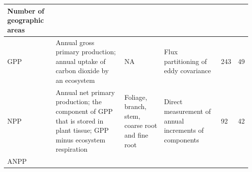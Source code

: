 \documentclass[]{article}
\begin{document}
\begin{longtable}[]{@{}llllll@{}}
\begin{minipage}[b]{0.07\columnwidth}
Number of geographic areas\strut
\end{minipage}\tabularnewline
\midrule
\endhead
\begin{minipage}[t]{0.14\columnwidth}\raggedright\strut
GPP\strut
\end{minipage} & \begin{minipage}[t]{0.19\columnwidth}\raggedright\strut
Annual gross primary production; annual uptake of carbon dioxide by an
ecosystem\strut
\end{minipage} & \begin{minipage}[t]{0.13\columnwidth}\raggedright\strut
NA\strut
\end{minipage} & \begin{minipage}[t]{0.23\columnwidth}\raggedright\strut
Flux partitioning of eddy covariance\strut
\end{minipage} & \begin{minipage}[t]{0.07\columnwidth}\raggedright\strut
243\strut
\end{minipage} & \begin{minipage}[t]{0.07\columnwidth}\raggedright\strut
49\strut
\end{minipage}\tabularnewline
\begin{minipage}[t]{0.14\columnwidth}\raggedright\strut
NPP\strut
\end{minipage} & \begin{minipage}[t]{0.19\columnwidth}\raggedright\strut
Annual net primary production; the component of GPP that is stored in
plant tissue; GPP minus ecosystem respiration\strut
\end{minipage} & \begin{minipage}[t]{0.13\columnwidth}\raggedright\strut
Foliage, branch, stem, coarse root and fine root\strut
\end{minipage} & \begin{minipage}[t]{0.23\columnwidth}\raggedright\strut
Direct measurement of annual increments of components\strut
\end{minipage} & \begin{minipage}[t]{0.07\columnwidth}\raggedright\strut
92\strut
\end{minipage} & \begin{minipage}[t]{0.07\columnwidth}\raggedright\strut
42\strut
\end{minipage}\tabularnewline
\begin{minipage}[t]{0.14\columnwidth}\raggedright\strut
ANPP\strut
\end{minipage} & \begin{minipage}[t]{0.19\columnwidth}\raggedright\strut

\end{minipage}
\end{longtable}
\end{document}
